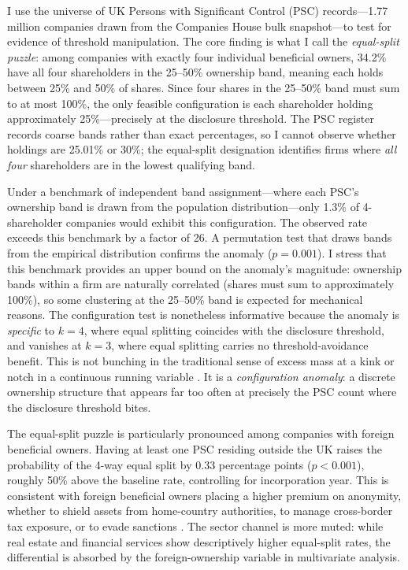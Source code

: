 \documentclass[12pt]{article}
\begin{document}
I use the universe of UK Persons with Significant Control (PSC) records---1.77 million companies drawn from the Companies House bulk snapshot---to test for evidence of threshold manipulation. The core finding is what I call the \textit{equal-split puzzle}: among companies with exactly four individual beneficial owners, 34.2\% have all four shareholders in the 25--50\% ownership band, meaning each holds between 25\% and 50\% of shares. Since four shares in the 25--50\% band must sum to at most 100\%, the only feasible configuration is each shareholder holding approximately 25\%---precisely at the disclosure threshold. The PSC register records coarse bands rather than exact percentages, so I cannot observe whether holdings are 25.01\% or 30\%; the equal-split designation identifies firms where \textit{all four} shareholders are in the lowest qualifying band.

Under a benchmark of independent band assignment---where each PSC's ownership band is drawn from the population distribution---only 1.3\% of 4-shareholder companies would exhibit this configuration. The observed rate exceeds this benchmark by a factor of 26. A permutation test that draws bands from the empirical distribution confirms the anomaly ($p = 0.001$). I stress that this benchmark provides an upper bound on the anomaly's magnitude: ownership bands within a firm are naturally correlated (shares must sum to approximately 100\%), so some clustering at the 25--50\% band is expected for mechanical reasons. The configuration test is nonetheless informative because the anomaly is \textit{specific} to $k = 4$, where equal splitting coincides with the disclosure threshold, and vanishes at $k = 3$, where equal splitting carries no threshold-avoidance benefit. This is not bunching in the traditional sense of excess mass at a kink or notch in a continuous running variable \citep{kleven2016bunching}. It is a \textit{configuration anomaly}: a discrete ownership structure that appears far too often at precisely the PSC count where the disclosure threshold bites.

The equal-split puzzle is particularly pronounced among companies with foreign beneficial owners. Having at least one PSC residing outside the UK raises the probability of the 4-way equal split by 0.33 percentage points ($p < 0.001$), roughly 50\% above the baseline rate, controlling for incorporation year. This is consistent with foreign beneficial owners placing a higher premium on anonymity, whether to shield assets from home-country authorities, to manage cross-border tax exposure, or to evade sanctions \citep{collin2021anonymous, obrien2019beneficial}. The sector channel is more muted: while real estate and financial services show descriptively higher equal-split rates, the differential is absorbed by the foreign-ownership variable in multivariate analysis.
\end{document}
